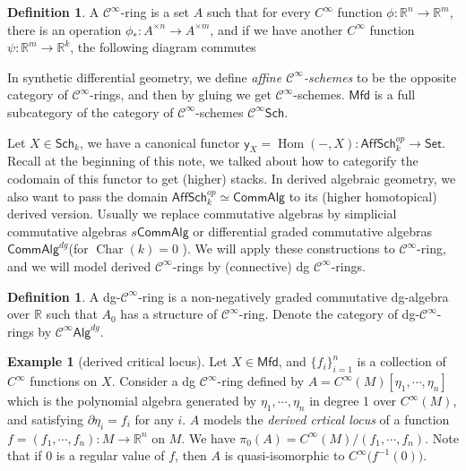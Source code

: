 \documentclass[11pt]{amsart}
\numberwithin{equation}{section}
\theoremstyle{definition}
\newtheorem{example}[thm]{Example}
\newtheorem{defn}[thm]{Definition}
\theoremstyle{remark}
\numberwithin{equation}{section}
\newcommand{\del}{\partial}
\renewcommand{\del}{\partial}
\newcommand{\cinf}{{\mathcal C}^{\infty}}
\newcommand{\R}{{\mathbb{R}}}
\newcommand{\y}{\mathsf{y}}
\newcommand{\set}{\mathsf{Set}}
\newcommand{\sch}{\mathsf{Sch}}
\newcommand{\aff}{\mathsf{Aff}}
\newcommand{\mfd}{\mathsf{Mfd}}
\newcommand{\alg}{\mathsf{Alg}}
\newcommand{\calg}{\mathsf{CommAlg}}
\newcommand{\Hom}{\operatorname{Hom}}
\newcommand{\Char}{\operatorname{Char}}
\begin{document}
\begin{defn}
	A $\cinf$-ring is a set $A$ such that for every $C^{\infty}$ function $\phi: \R^n\to \R^m$, there is an operation $\phi_*: A^{\times n}\to A^{\times m}$, and if we have another $C^{\infty}$ function $\psi: \R^m \to \R^k$, the following diagram commutes
	\begin{center}
	\end{center}
\end{defn}

In synthetic differential geometry, we define {\it affine $\cinf$-schemes} to be the opposite category of $\cinf$-rings, and then by gluing we get $\cinf$-schemes. $\mfd$ is a full subcategory of the category of $\cinf$-schemes $\cinf\sch$.

Let $X\in \sch_k$, we have a canonical functor $\y_X=\Hom(-,X): \aff\sch_k^{op}\to \set$. Recall at the beginning of this note, we talked about how to categorify the codomain of this functor to get (higher) stacks. In derived algebraic geometry, we also want to pass the domain  $\aff\sch_k^{op}\simeq \calg$ to its (higher homotopical) derived version. Usually we replace commutative algebras by simplicial commutative algebras $s\calg$ or differential graded commutative algebras $\calg^{dg}$(for $\Char(k)=0$ ). We will apply these constructions to $\cinf$-ring, and we will model derived $\cinf$-rings by (connective) dg $\cinf$-rings.

\begin{defn}
	A dg-$\cinf$-ring is a non-negatively graded commutative dg-algebra over $\R$ such that $A_0$ has a structure of $\cinf$-ring. Denote the category of dg-$\cinf$-rings by $\cinf\alg^{dg}$.
\end{defn}
\begin{example}[derived critical locus]
	Let $X\in\mfd$, and $\{f_i\}_{i=1}^n$ is a collection of $C^{\infty}$ functions on $X$. Consider a dg $\cinf$-ring defined by $A=C^{\infty}(M)[\eta_1,\cdots, \eta_n]$ which is the polynomial algebra generated by $\eta_1,\cdots, \eta_n$ in degree 1 over $ C^{\infty}(M)$, and satisfying $\del \eta_i =f_i$ for any $i$. $A$ models the {\it derived crtical locus} of a function $f=(f_1,\cdots,f_n): M\to \R^n$ on $M$. We have $\pi_0(A)=C^{\infty}(M)/(f_1,\cdots,f_n)$. Note that if $0$ is a regular value of $f$, then $A$ is quasi-isomorphic to $C^{\infty}\big(f^{-1}(0) \big)$. 
\end{example}
\end{document}
